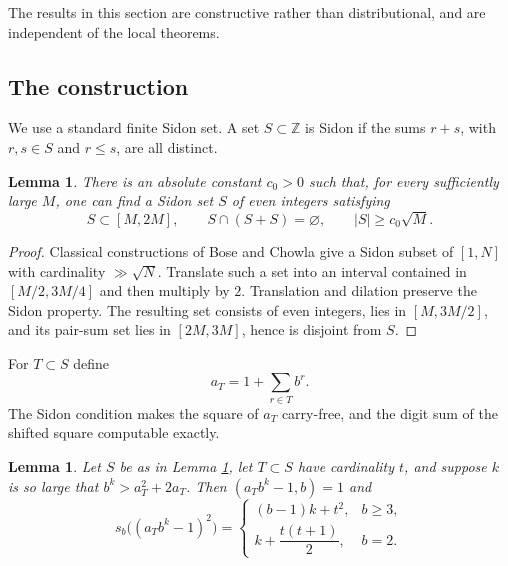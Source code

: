 \documentclass[11pt,reqno]{amsart}
\theoremstyle{plain}
\newtheorem{lemma}[theorem]{Lemma}
\theoremstyle{definition}
\newcommand{\Z}{\mathbb{Z}}
\newcommand{\1}{\mathbf 1}
\begin{document}
The results in this section are constructive rather than distributional, and are independent of the local theorems.

\subsection{The construction}
We use a standard finite Sidon set.  A set $S\subset\Z$ is Sidon if the sums $r+s$, with $r,s\in S$ and $r\le s$, are all distinct.

\begin{lemma}\label{lem:sidon}
There is an absolute constant $c_0>0$ such that, for every sufficiently large $M$, one can find a Sidon set $S$ of even integers satisfying
\[
 S\subset[M,2M],\qquad S\cap(S+S)=\varnothing,
 \qquad |S|\ge c_0\sqrt M.
\]
\end{lemma}

\begin{proof}
Classical constructions of Bose and Chowla \cite{bosechowla} give a Sidon subset of $[1,N]$ with cardinality $\gg\sqrt N$.  Translate such a set into an interval contained in $[M/2,3M/4]$ and then multiply by $2$.  Translation and dilation preserve the Sidon property.  The resulting set consists of even integers, lies in $[M,3M/2]$, and its pair-sum set lies in $[2M,3M]$, hence is disjoint from $S$.
\end{proof}

For $T\subset S$ define
\begin{equation}\label{eq:aT}
 a_T=1+\sum_{r\in T}b^r.
\end{equation}
The Sidon condition makes the square of $a_T$ carry-free, and the digit sum of the shifted square computable exactly.

\begin{lemma}\label{lem:sidon-square}
Let $S$ be as in Lemma \ref{lem:sidon}, let $T\subset S$ have cardinality $t$, and suppose $k$ is so large that
$b^k>a_T^2+2a_T$.
Then $(a_Tb^k-1,b)=1$ and
\[
 s_b\big((a_Tb^k-1)^2\big)=
 \begin{cases}
 (b-1)k+t^2,&b\ge3,\\[3pt]
 k+\dfrac{t(t+1)}2,&b=2.
 \end{cases}
\]
\end{lemma}
\end{document}
